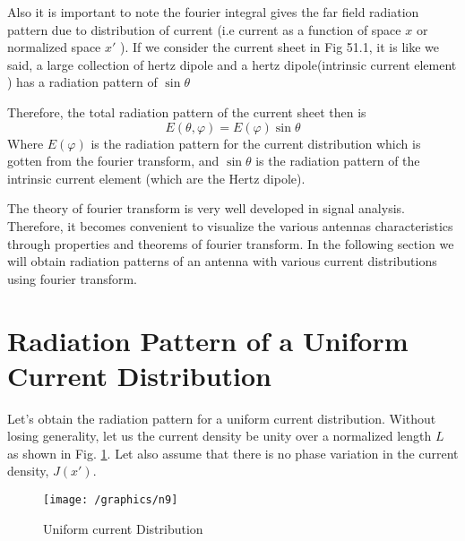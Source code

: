 Also it is important to note the fourier integral gives the far field radiation pattern due to distribution of current (i.e current as a function of space $x$ or normalized space $x'$ ). If we consider the current sheet in Fig 51.1, it is like we said, a large collection of hertz dipole and a hertz dipole(intrinsic current element ) has a radiation pattern of $\sin\theta$

Therefore, the total radiation pattern of the current sheet then
is $$E(\theta, \varphi) = E(\varphi)\sin\theta$$
Where $E(\varphi)$ is the radiation pattern for the current distribution which is gotten from the fourier transform, and $\sin\theta$ is the radiation pattern of the intrinsic current element (which are the Hertz dipole).

The theory of fourier transform is very well developed in signal analysis. Therefore, it becomes convenient to visualize the various antennas characteristics through properties and theorems of fourier transform. In the following section we will obtain radiation patterns of an antenna with various current distributions using fourier transform.

\section{Radiation Pattern of a Uniform Current Distribution}
Let's obtain the radiation pattern for a uniform current distribution. Without losing generality, let us the current density be unity over a normalized length $L$ as shown in Fig. \ref{fig9}. Let also assume that there is no phase variation in the current density, $J(x')$.
\begin{figure}[h]
\centering
\texttt{[image: /graphics/n9]}
\caption{Uniform current Distribution}
\label{fig9}
\end{figure}

